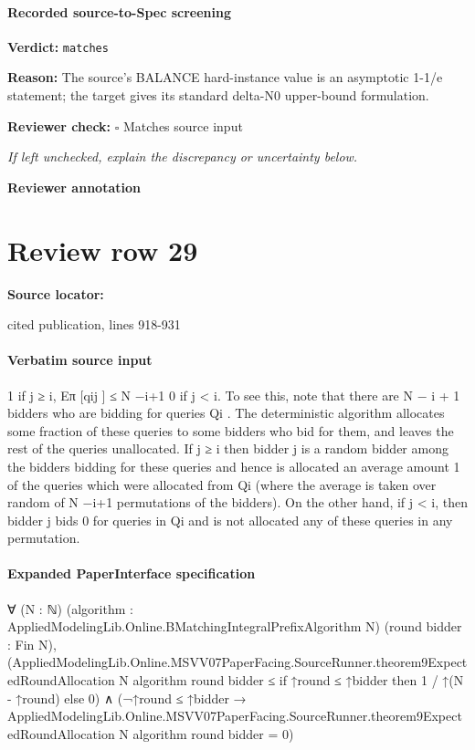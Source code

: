 \documentclass[10pt]{article}
\newcommand{\reviewerbox}{%
  \par\noindent\fbox{\parbox{0.96\linewidth}{\rule{0pt}{0.38in}}}\par
}
\newcommand{\reviewmatch}[1]{%
  \par\noindent\textbf{Reviewer check:} $\square$\; #1\par
  \noindent\emph{If left unchecked, explain the discrepancy or uncertainty below.}\par
}
\begin{document}
\paragraph{Recorded source-to-Spec screening}
\textbf{Verdict:} \texttt{matches}
\\
{\raggedright
\textbf{Reason:} The source's BALANCE hard-\allowbreak{}instance value is an asymptotic 1-\allowbreak{}1/\allowbreak{}e statement;\allowbreak{} the target gives its standard delta-\allowbreak{}N0 upper-\allowbreak{}bound formulation.\allowbreak{}
\par}
\reviewmatch{Matches source input}
\noindent\textbf{Reviewer annotation}\par
\reviewerbox
\clearpage
\hypertarget{source-claim-d63f92859f69ca1d}{}
\section*{Review row 29}
\textbf{Source locator:} {\footnotesize\raggedright cited publication, lines 918-\allowbreak{}931\par}
\paragraph{Verbatim source input}
\begin{ReviewVerbatim}
1
if j ≥ i,
Eπ [qij ] ≤ N −i+1
0
if j < i.
To see this, note that there are N − i + 1 bidders who are bidding for queries Qi . The
deterministic algorithm allocates some fraction of these queries to some bidders who bid for
them, and leaves the rest of the queries unallocated. If j ≥ i then bidder j is a random
bidder among the bidders bidding for these queries and hence is allocated an average amount
1
of the queries which were allocated from Qi (where the average is taken over random
of N −i+1
permutations of the bidders). On the other hand, if j < i, then bidder j bids 0 for queries in
Qi and is not allocated any of these queries in any permutation.
\end{ReviewVerbatim}



\paragraph{Expanded PaperInterface specification}
\begin{ReviewVerbatim}
∀ (N : ℕ) (algorithm : AppliedModelingLib.Online.BMatchingIntegralPrefixAlgorithm N) (round bidder : Fin N),
  (AppliedModelingLib.Online.MSVV07PaperFacing.SourceRunner.theorem9ExpectedRoundAllocation N algorithm round bidder ≤
      if ↑round ≤ ↑bidder then 1 / ↑(N - ↑round) else 0) ∧
    (¬↑round ≤ ↑bidder →
      AppliedModelingLib.Online.MSVV07PaperFacing.SourceRunner.theorem9ExpectedRoundAllocation N algorithm round
          bidder =
        0)
\end{ReviewVerbatim}
\end{document}
